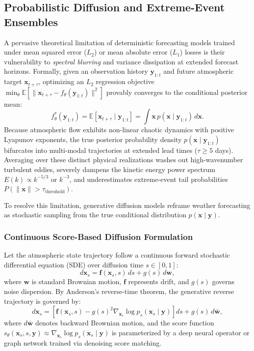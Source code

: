 \subsection{Probabilistic Diffusion and Extreme-Event Ensembles}
\label{sec:diffusion_ensembles}
A pervasive theoretical limitation of deterministic forecasting models trained under mean squared error ($L_2$) or mean absolute error ($L_1$) losses is their vulnerability to \textit{spectral blurring} and variance dissipation at extended forecast horizons. Formally, given an observation history $\mathbf{y}_{1:t}$ and future atmospheric target $\mathbf{x}_{t+\tau}$, optimizing an $L_2$ regression objective $\min_\theta \mathbb{E}[\|\mathbf{x}_{t+\tau} - f_\theta(\mathbf{y}_{1:t})\|^2]$ provably converges to the conditional posterior mean:
\begin{equation}
    f^*_\theta(\mathbf{y}_{1:t}) = \mathbb{E}[\mathbf{x}_{t+\tau} \mid \mathbf{y}_{1:t}] = \int \mathbf{x} \, p(\mathbf{x} \mid \mathbf{y}_{1:t}) \, d\mathbf{x}.
\end{equation}
Because atmospheric flow exhibits non-linear chaotic dynamics with positive Lyapunov exponents, the true posterior probability density $p(\mathbf{x} \mid \mathbf{y}_{1:t})$ bifurcates into multi-modal trajectories at extended lead times ($\tau \ge 5$ days). Averaging over these distinct physical realizations washes out high-wavenumber turbulent eddies, severely dampens the kinetic energy power spectrum $E(k) \propto k^{-5/3}$ or $k^{-3}$, and underestimates extreme-event tail probabilities $P(\|\mathbf{x}\| > \tau_{\text{threshold}})$.

To resolve this limitation, generative diffusion models reframe weather forecasting as stochastic sampling from the true conditional distribution $p(\mathbf{x} \mid \mathbf{y})$.

\subsubsection{Continuous Score-Based Diffusion Formulation}
Let the atmospheric state trajectory follow a continuous forward stochastic differential equation (SDE) over diffusion time $s \in [0, 1]$:
\begin{equation}
    d\mathbf{x}_s = \mathbf{f}(\mathbf{x}_s, s) \, ds + g(s) \, d\mathbf{w},
\end{equation}
where $\mathbf{w}$ is standard Brownian motion, $\mathbf{f}$ represents drift, and $g(s)$ governs noise dispersion. By Anderson's reverse-time theorem, the generative reverse trajectory is governed by:
\begin{equation}
    d\mathbf{x}_s = \left[ \mathbf{f}(\mathbf{x}_s, s) - g(s)^2 \nabla_{\mathbf{x}_s} \log p_s(\mathbf{x}_s \mid \mathbf{y}) \right] ds + g(s) \, d\mathbf{\bar{w}},
\end{equation}
where $d\mathbf{\bar{w}}$ denotes backward Brownian motion, and the score function $s_\theta(\mathbf{x}_s, s, \mathbf{y}) \approx \nabla_{\mathbf{x}_s} \log p_s(\mathbf{x}_s \mid \mathbf{y})$ is parameterized by a deep neural operator or graph network trained via denoising score matching.

